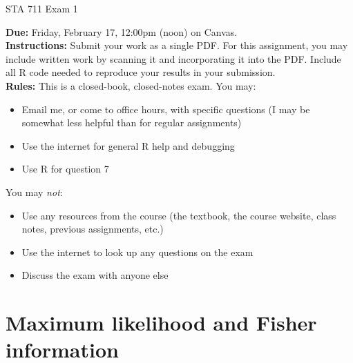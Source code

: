 \documentclass[11pt]{article}
\begin{document}
\begin{center}
\Large
STA 711 Exam 1\\
\normalsize
\vspace{5mm}
\end{center}

\noindent \textbf{Due:} Friday, February 17, 12:00pm (noon) on Canvas.\\ 

\noindent \textbf{Instructions:} Submit your work as a single PDF. For this assignment, you may include written work by scanning it and incorporating it into the PDF. Include all R code needed to reproduce your results in your submission.\\

\noindent \textbf{Rules:} This is a closed-book, closed-notes exam. You may:
\begin{itemize}
\item Email me, or come to office hours, with specific questions (I may be somewhat less helpful than for regular assignments)
\item Use the internet for general R help and debugging
\item Use R for question 7
\end{itemize}
You may \textit{not}:
\begin{itemize}
\item Use any resources from the course (the textbook, the course website, class notes, previous assignments, etc.)
\item Use the internet to look up any questions on the exam
\item Discuss the exam with anyone else
\end{itemize}

\newpage

\section*{Maximum likelihood and Fisher information}
\end{document}
